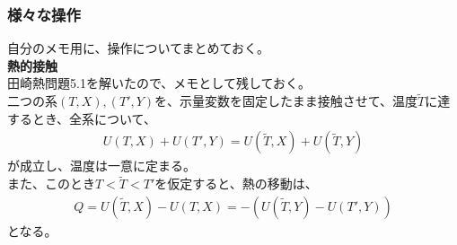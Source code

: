 \documentclass[a4paper,11pt]{jsarticle}
\numberwithin{equation}{section}
\begin{document}
\subsubsection{様々な操作}
自分のメモ用に、操作についてまとめておく。\\
\textbf{熱的接触}\\
田崎熱問題5.1を解いたので、メモとして残しておく。\\
二つの系$(T,X),(T',Y) $を、示量変数を固定したまま接触させて、温度$\tilde{T}$に達するとき、全系について、
\begin{align}
  U(T,X)+U(T',Y) = U(\tilde{T},X)+U(\tilde{T},Y)
\end{align}
が成立し、温度は一意に定まる。\\
また、このとき$T<\tilde{T}<T'$を仮定すると、熱の移動は、
\begin{align}
  Q = U(\tilde{T},X)-U(T,X) = -(U(\tilde{T},Y)-U(T',Y)) 
\end{align}
となる。\\
\end{document}
